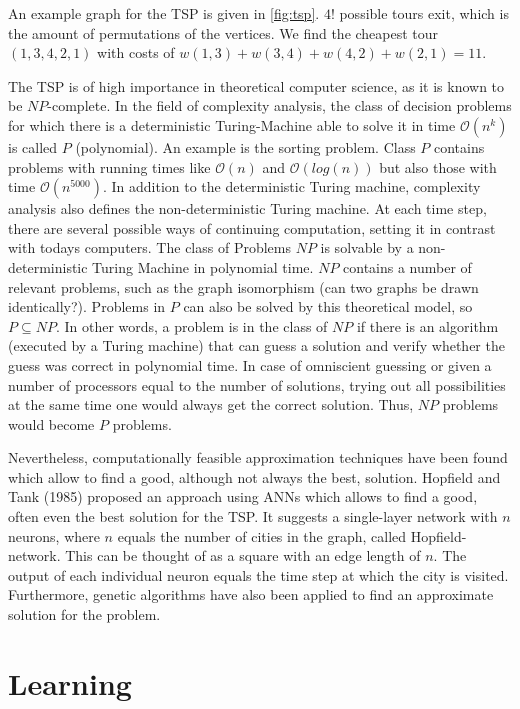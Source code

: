 \documentclass[10pt,a4paper,DIV=11]{scrreprt}
\begin{document}
An example graph for the TSP is given in \ref{fig:tsp}. $4!$ possible tours exit, which is the amount of permutations of the vertices.
We find the cheapest tour $(1, 3, 4, 2, 1)$ with costs of $w(1, 3) + w(3, 4) + w(4, 2) + w(2, 1) = 11$.

The TSP is of high importance in theoretical computer science, as it is known to be $NP$-complete. In the field of complexity analysis, 
the class of decision problems for which there is a deterministic Turing-Machine able to solve it in time $\mathcal{O}(n^k)$ is called $P$ 
(polynomial). An example is the sorting problem. Class $P$ contains problems with running times like $\mathcal{O}(n)$ and $\mathcal{O}(log(n))$ but 
also those with time $\mathcal{O}(n^{5000})$. In addition to the deterministic Turing machine, complexity analysis also defines the non-deterministic
Turing machine. At each time step, there are several possible ways of continuing computation, setting it in contrast with todays computers. The 
class of Problems $NP$ is solvable by a non-deterministic Turing Machine in polynomial time. $NP$ contains a number of relevant problems, such as 
the graph isomorphism (can two graphs be drawn identically?). Problems in $P$ can also be solved by this theoretical model, so $P \subseteq NP$. 
In other words, a problem is in the class of $NP$ if there is an algorithm (executed by a Turing machine) that can guess a solution and verify 
whether the guess was correct in polynomial time. In case of omniscient guessing or given a number of processors equal to the number of solutions, 
trying out all possibilities at the same time one would always get the correct solution. Thus, $NP$ problems would become $P$ problems. 


Nevertheless, computationally feasible approximation techniques have been found which allow to find a good, although not always the best, solution. 
Hopfield and Tank (1985) proposed an approach using ANNs which allows to find a good, often even the best solution for the TSP. It suggests a 
single-layer network with $n$ neurons, where $n$ equals the number of cities in the graph, called Hopfield-network. This can be thought of as a 
square with an edge length of $n$. The output of each individual neuron equals the time step at which the city is visited. Furthermore, 
genetic algorithms have also been applied to find an approximate solution for the problem.\cite{GENTSP}

\chapter{Learning}
\label{ch:learning}
\end{document}
